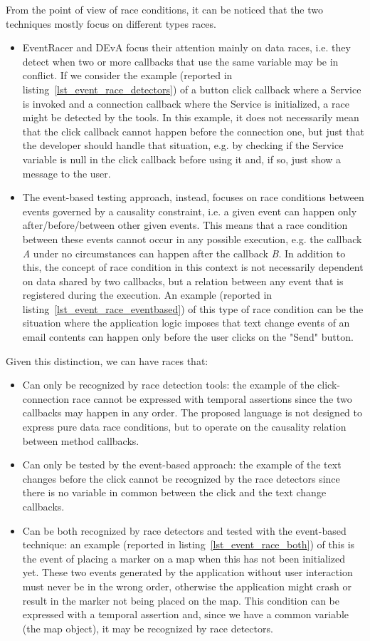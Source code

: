 \documentclass[11pt,a4paper,notitlepage]{article}
\begin{document}
From the point of view of race conditions, it can be noticed that the two techniques mostly focus on different types races.
\begin{itemize}
	\item EventRacer and DEvA focus their attention mainly on data races, i.e. they detect when two or more callbacks that use the same variable may be in conflict. If we consider the example (reported in listing~\ref{lst_event_race_detectors}) of a button click callback where a Service is invoked and a connection callback where the Service is initialized, a race might be detected by the tools. In this example, it does not necessarily mean that the click callback cannot happen before the connection one, but just that the developer should handle that situation, e.g. by checking if the Service variable is null in the click callback before using it and, if so, just show a message to the user.
	\item The event-based testing approach, instead, focuses on race conditions between events governed by a causality constraint, i.e. a given event can happen only after/before/between other given events. This means that a race condition between these events cannot occur in any possible execution, e.g. the callback \textit{A} under no circumstances can happen after the callback \textit{B}. In addition to this, the concept of race condition in this context is not necessarily dependent on data shared by two callbacks, but a relation between any event that is registered during the execution. An example (reported in listing~\ref{lst_event_race_eventbased}) of this type of race condition can be the situation where the application logic imposes that text change events of an email contents can happen only before the user clicks on the "Send" button.
\end{itemize}
Given this distinction, we can have races that:
\begin{itemize}
	\item Can only be recognized by race detection tools: the example of the click-connection race cannot be expressed with temporal assertions since the two callbacks may happen in any order. The proposed language is not designed to express pure data race conditions, but to operate on the causality relation between method callbacks.
	\item Can only be tested by the event-based approach: the example of the text changes before the click cannot be recognized by the race detectors since there is no variable in common between the click and the text change callbacks.
	\item Can be both recognized by race detectors and tested with the event-based technique: an example (reported in listing~\ref{lst_event_race_both}) of this is the event of placing a marker on a map when this has not been initialized yet. These two events generated by the application without user interaction must never be in the wrong order, otherwise the application might crash or result in the marker not being placed on the map. This condition can be expressed with a temporal assertion and, since we have a common variable (the map object), it may be recognized by race detectors.
\end{itemize}
\end{document}
